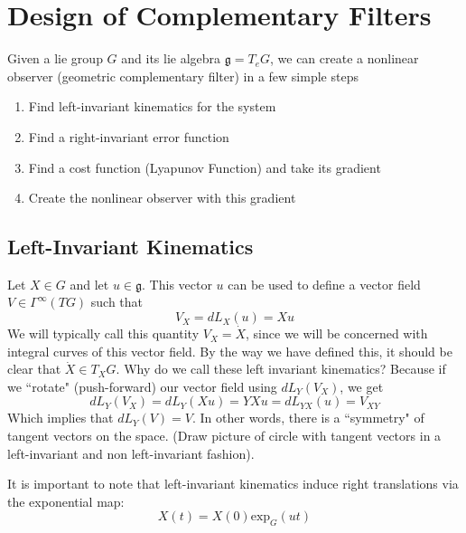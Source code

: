 \documentclass[a4paper]{article}
\begin{document}
\section*{Design of Complementary Filters}

Given a lie group $G$ and its lie algebra $\mathfrak{g} = T_eG$, we can create a nonlinear observer (geometric complementary filter) in a few simple steps

\begin{enumerate}
  \item Find left-invariant kinematics for the system
  \item Find a right-invariant error function 
  \item Find a cost function (Lyapunov Function) and take its gradient
  \item Create the nonlinear observer with this gradient
\end{enumerate}

\subsection*{Left-Invariant Kinematics}%
Let $X \in G$ and let $u \in \mathfrak{g}$. This vector $u$ can be used to define a vector field $V \in \Gamma^{\infty}(TG)$ such that
\[
  V_X = dL_X(u) = Xu
\]
We will typically call this quantity $V_X = \dot{X}$, since we will be concerned with integral curves of this vector field. By the way we have defined this, it should be clear that $\dot{X} \in T_XG$. Why do we call these left invariant kinematics? Because if we ``rotate" (push-forward) our vector field using $dL_Y(V_X)$, we get
\[
  dL_Y(V_X) = dL_Y(Xu) = YXu = dL_{YX}(u) = V_{XY}
\]
Which implies that $dL_Y(V) = V$. In other words, there is a ``symmetry" of tangent vectors on the space. (Draw picture of circle with tangent vectors in a left-invariant and non left-invariant fashion). 

It is important to note that left-invariant kinematics induce right translations via the exponential map: 
\[
  X(t) = X(0) \text{exp}_G \left(ut\right)
\]
\end{document}
